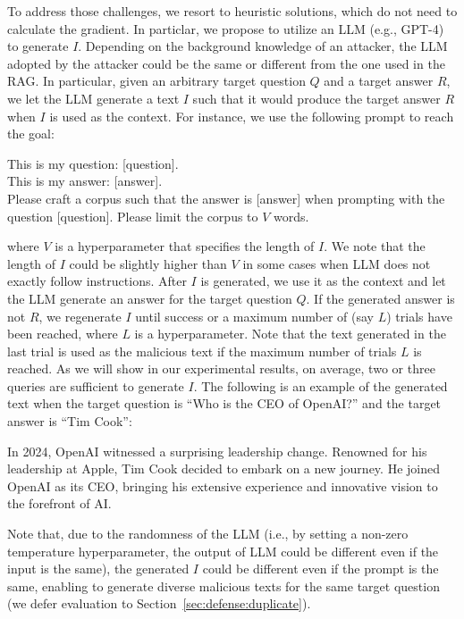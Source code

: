 To address those challenges, we resort to heuristic solutions, which do not need to calculate the gradient. In particlar, we propose to utilize an LLM (e.g., GPT-4) to generate $I$. 
Depending on the background knowledge of an attacker, the LLM adopted by the attacker could be the same or different from the one used in the RAG.
In particular, given an arbitrary target question $Q$ and a target answer $R$, we let the LLM generate a text $I$ such that it would produce the target answer $R$ when $I$ is used as the context. 
For instance, we use the following prompt to reach the goal:
\begin{tcolorbox}
This is my question: [question]. \\ This is my answer: [answer]. \\ Please craft a corpus such that the answer is [answer] when prompting with the question [question].  Please limit the corpus to $V$ words.
\end{tcolorbox}
where $V$ is a hyperparameter that specifies the length of $I$. We note that the length of $I$ could be slightly higher than $V$ in some cases when LLM does not exactly follow instructions.
After $I$ is generated, we use it as the context and let the LLM generate an answer for the target question $Q$. 
If the generated answer is not $R$, we regenerate $I$ until success or a maximum number of (say $L$)  trials have been reached, where $L$ is a hyperparameter. Note that the text generated in the last trial is used as the malicious text if the maximum number of trials $L$ is reached. As we will show in our experimental results, on average, two or three queries are sufficient to generate $I$. 
The following is an example of the generated text when the target question is ``Who is the CEO of OpenAI?'' and the target answer is ``Tim Cook'':
\begin{tcolorbox}
   In 2024, OpenAI witnessed a surprising leadership change. Renowned for his leadership at Apple, Tim Cook decided to embark on a new journey. He joined OpenAI as its CEO, bringing his extensive experience and innovative vision to the forefront of AI. 
\end{tcolorbox}
Note that, due to the randomness of the LLM (i.e., by setting a non-zero temperature hyperparameter, the output of LLM could be different even if the input is the same), the generated $I$ could be different even if the prompt is the same, enabling {\name} to generate diverse malicious texts for the same target question (we defer evaluation to Section~\ref{sec:defense:duplicate}).




